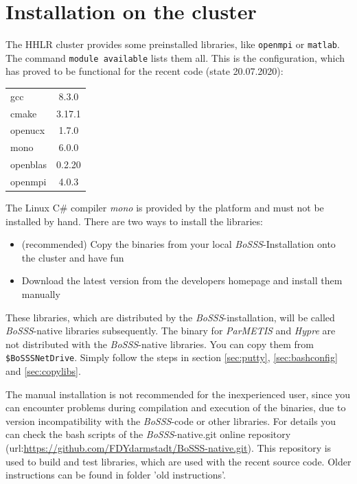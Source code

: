 \documentclass[11pt,twoside,a4paper]{fdyartcl}
\newcommand{\Bosss}{\textit{BoSSS}}
\begin{document}
\section{Installation on the cluster}

The HHLR cluster provides some preinstalled libraries, like \verb|openmpi| or \verb|matlab|. The command \verb|module available|  lists them all. This is the configuration, which has proved to be functional for the recent code (state 20.07.2020):
\begin{table}[h]
	\centering
	\begin{tabular}{l|c}
		gcc & 8.3.0 \\
		cmake & 3.17.1 \\
		openucx & 1.7.0 \\
		mono & 6.0.0 \\
		openblas & 0.2.20 \\
		openmpi & 4.0.3
	\end{tabular}
\end{table}
The Linux C\# compiler \emph{mono} is provided by the platform and must not be installed by hand. There are two ways to install the libraries:
\begin{itemize}
	\item (recommended) Copy the binaries from your local \Bosss-Installation onto the cluster and have fun
	\item Download the latest version from the developers homepage and install them manually 
\end{itemize}

These libraries, which are distributed by the \Bosss-installation, will be called \Bosss-native libraries subsequently.
The binary for \emph{ParMETIS} and \emph{Hypre} are not distributed with the \Bosss-native libraries. You can copy them from \verb|$BoSSSNetDrive|. Simply follow the steps in section \ref{sec:putty}, \ref{sec:bashconfig} and \ref{sec:copylibs}.

The manual installation is not recommended for the inexperienced user, since you can encounter problems during compilation and execution of the binaries, due to version incompatibility with the \Bosss-code or other libraries.
For details you can check the bash scripts of the \Bosss-native.git online repository (url:\url{https://github.com/FDYdarmstadt/BoSSS-native.git}). This repository is used to build and test libraries, which are used with the recent source code.
Older instructions can be found in folder 'old instructions'.
\end{document}
